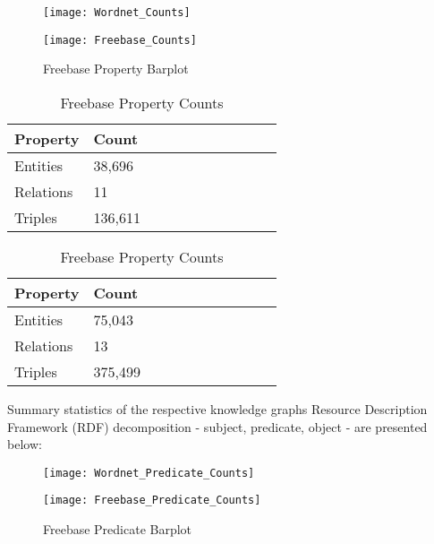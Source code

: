\begin{figure}[H]
	\parbox{.5\linewidth}{
   		\caption{Wordnet Property Barplot}
   		\centering
    		\texttt{[image: Wordnet\_Counts]}
		}
	\hfill
	\parbox{.5\linewidth}{
		\caption{Freebase Property Barplot}
   		\centering
    		\texttt{[image: Freebase\_Counts]}
		}
\end{figure}


\begin{table}[H]
	\parbox{.5\linewidth}{
		\caption{Wordnet Property Counts}
		\centering
		\begin{tabular}{lllllllllll}
  			\textbf{Property} & \textbf{Count}  \\
  			\hline
  			Entities & 38,696  \\
  			Relations & 11  \\
  			Triples & 136,611  \\
		\end{tabular}
		}
	\hfill
	\parbox{.5\linewidth}{
		\caption{Freebase Property Counts}
		\centering
		\begin{tabular}{lllllllllll}
  			\textbf{Property} & \textbf{Count}  \\
  			\hline
  			Entities & 75,043   \\
  			Relations & 13  \\
  			Triples & 375,499  \\
		\end{tabular}
		}
\end{table}


Summary statistics of the respective knowledge graphs Resource Description Framework (RDF) decomposition - subject, predicate, object - are presented below:


\begin{figure}[H]
	\parbox{.5\linewidth}{
   		\caption{Wordnet Predicate Barplot}
   		\centering
    		\texttt{[image: Wordnet\_Predicate\_Counts]}
		}
	\hfill
	\parbox{.5\linewidth}{
		\caption{Freebase Predicate Barplot}
   		\centering
		\texttt{[image: Freebase\_Predicate\_Counts]}
		}
\end{figure}

